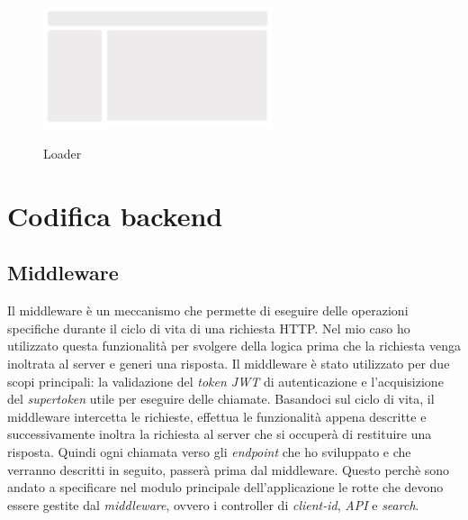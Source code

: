 \begin{figure}[ht]
  \centering
  \includegraphics[width=0.6\textwidth, alt={Skeleton loader di caricamento principale dell'applicazione}]{images/frontend/Loader.jpg}
  \caption{Loader}\label{fig:loader}
\end{figure}
\pagebreak

\section{Codifica backend}\label{sec:codifica-backend}

\subsection{Middleware}\label{subsec:middleware}
Il middleware è un meccanismo che permette di eseguire delle operazioni specifiche durante il ciclo di vita di una richiesta HTTP. 
Nel mio caso ho utilizzato questa funzionalità per svolgere della logica prima che la richiesta venga inoltrata al server e generi una risposta.
Il middleware è stato utilizzato per due scopi principali: la validazione del \textit{token JWT} di autenticazione e l'acquisizione del \textit{supertoken} utile per eseguire delle chiamate.
Basandoci sul ciclo di vita, il middleware intercetta le richieste, effettua le funzionalità appena descritte e successivamente inoltra la richiesta al server che si occuperà di restituire una risposta.
Quindi ogni chiamata verso gli \textit{endpoint} che ho sviluppato e che verranno descritti in seguito, passerà prima dal middleware. Questo perchè sono andato a specificare
nel modulo principale dell'applicazione le rotte che devono essere gestite dal \textit{middleware}, ovvero i controller di \textit{client-id}, \textit{API} e \textit{search}.


